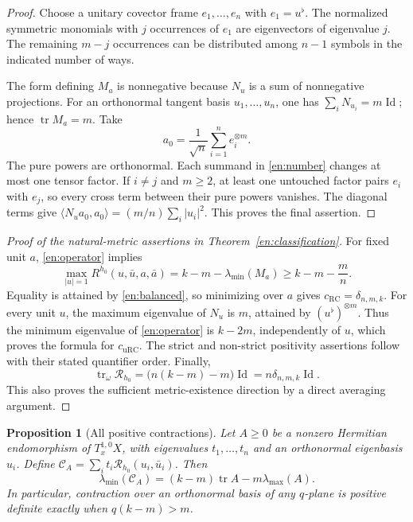 \documentclass[12pt]{amsart}
\newtheorem{prop}[thm]{Proposition}
\theoremstyle{definition}
\theoremstyle{remark}
\numberwithin{equation}{section}
\DeclareMathOperator{\tr}{tr}
\DeclareMathOperator{\Id}{Id}
\newcommand{\urc}{\mathrm{uRC}}
\newcommand{\rc}{\mathrm{RC}}
\newcommand{\cst}{\delta_{n,m,k}}
\newcommand{\eref}[1]{\eqref{en:#1}}
\begin{document}
\begin{proof}
Choose a unitary covector frame $e_1,\ldots,e_n$ with $e_1=u^\flat$. The normalized symmetric monomials with $j$ occurrences of $e_1$ are eigenvectors of eigenvalue $j$. The remaining $m-j$ occurrences can be distributed among $n-1$ symbols in the indicated number of ways.

The form defining $M_a$ is nonnegative because $N_u$ is a sum of nonnegative projections. For an orthonormal tangent basis $u_1,\ldots,u_n$, one has $\sum_iN_{u_i}=m\Id$; hence $\tr M_a=m$. Take
\begin{equation}\label{en:balanced}
a_0=\frac1{\sqrt n}\sum_{i=1}^n e_i^{\otimes m}.
\end{equation}
The pure powers are orthonormal. Each summand in \eref{number} changes at most one tensor factor. If $i\ne j$ and $m\ge2$, at least one untouched factor pairs $e_i$ with $e_j$, so every cross term between their pure powers vanishes. The diagonal terms give
$\langle N_u a_0,a_0\rangle=(m/n)\sum_i|u_i|^2$. This proves the final assertion.
\end{proof}

\begin{proof}[Proof of the natural-metric assertions in Theorem~\ref{en:classification}]
For fixed unit $a$, \eref{operator} implies
\begin{equation}\label{en:optimization}
\max_{|u|=1}R^{h_0}(u,\bar u,a,\bar a)
=k-m-\lambda_{\min}(M_a)\ge k-m-\frac mn.
\end{equation}
Equality is attained by \eref{balanced}, so minimizing over $a$ gives $c_{\rc}=\cst$. For every unit $u$, the maximum eigenvalue of $N_u$ is $m$, attained by $(u^\flat)^{\otimes m}$. Thus the minimum eigenvalue of \eref{operator} is $k-2m$, independently of $u$, which proves the formula for $c_{\urc}$. The strict and non-strict positivity assertions follow with their stated quantifier order. Finally,
\begin{equation}\label{en:mean}
\tr_\omega\mathcal R_{h_0}
=\bigl(n(k-m)-m\bigr)\Id=n\cst\Id.
\end{equation}
This also proves the sufficient metric-existence direction by a direct averaging argument.
\end{proof}

\begin{prop}[All positive contractions]\label{en:contraction}
Let $A\ge0$ be a nonzero Hermitian endomorphism of $T_x^{1,0}X$, with eigenvalues $t_1,\ldots,t_n$ and an orthonormal eigenbasis $u_i$. Define $\mathcal C_A=\sum_i t_i\mathcal R_{h_0}(u_i,\bar u_i)$. Then
\begin{equation}\label{en:weighted}
\lambda_{\min}(\mathcal C_A)
=(k-m)\tr A-m\lambda_{\max}(A).
\end{equation}
In particular, contraction over an orthonormal basis of any $q$-plane is positive definite exactly when $q(k-m)>m$.
\end{prop}
\end{document}

